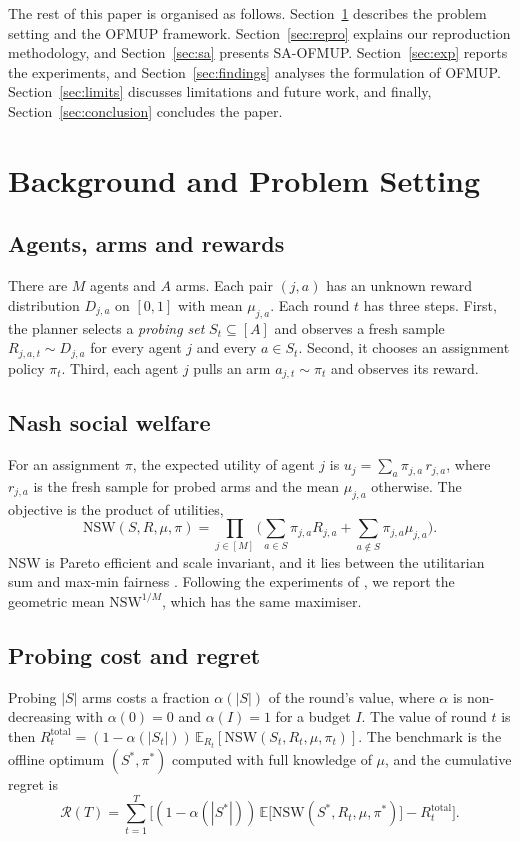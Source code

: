 \documentclass[letterpaper]{article}
\newcommand{\NSW}{\mathrm{NSW}}
\newcommand{\E}{\mathbb{E}}
\begin{document}
The rest of this paper is organised as follows. Section~\ref{sec:background}
describes the problem setting and the OFMUP framework.
Section~\ref{sec:repro} explains our reproduction methodology, and
Section~\ref{sec:sa} presents SA-OFMUP. Section~\ref{sec:exp} reports the
experiments, and Section~\ref{sec:findings} analyses the formulation of OFMUP.
Section~\ref{sec:limits} discusses limitations and future work, and finally,
Section~\ref{sec:conclusion} concludes the paper.

\section{Background and Problem Setting}
\label{sec:background}

\subsection{Agents, arms and rewards}
There are $M$ agents and $A$ arms. Each pair $(j,a)$ has an unknown reward
distribution $D_{j,a}$ on $[0,1]$ with mean $\mu_{j,a}$. Each round $t$ has three
steps. First, the planner selects a \emph{probing set} $S_t\subseteq[A]$ and
observes a fresh sample $R_{j,a,t}\sim D_{j,a}$ for every agent $j$ and every
$a\in S_t$. Second, it chooses an assignment policy $\pi_t$. Third, each agent
$j$ pulls an arm $a_{j,t}\sim\pi_t$ and observes its reward.

\subsection{Nash social welfare}
For an assignment $\pi$, the expected utility of agent $j$ is $u_j=\sum_a
\pi_{j,a}\,r_{j,a}$, where $r_{j,a}$ is the fresh sample for probed arms and the
mean $\mu_{j,a}$ otherwise. The objective is the product of utilities,
\begin{equation}
  \NSW(S,R,\mu,\pi)=\prod_{j\in[M]}\Big(\sum_{a\in S}\pi_{j,a}R_{j,a}+\sum_{a\notin S}\pi_{j,a}\mu_{j,a}\Big).
  \label{eq:nsw}
\end{equation}
NSW is Pareto efficient and scale invariant, and it lies between the
utilitarian sum and max-min fairness \citep{caragiannis2019unreasonable}.
Following the experiments of \citet{xu2026fair}, we report the geometric mean
$\NSW^{1/M}$, which has the same maximiser.

\subsection{Probing cost and regret}
Probing $|S|$ arms costs a fraction $\alpha(|S|)$ of the round's value, where
$\alpha$ is non-decreasing with $\alpha(0)=0$ and $\alpha(I)=1$ for a budget $I$.
The value of round $t$ is then
$R^{\mathrm{total}}_t=(1-\alpha(|S_t|))\,\E_{R_t}[\NSW(S_t,R_t,\mu,\pi_t)]$. The
benchmark is the offline optimum $(S^\ast,\pi^\ast)$ computed with full
knowledge of $\mu$, and the cumulative regret is
\begin{equation}
  \mathcal{R}(T)=\sum_{t=1}^T\Big[(1-\alpha(|S^\ast|))\,\E\big[\NSW(S^\ast,R_t,\mu,\pi^\ast)\big]-R^{\mathrm{total}}_t\Big].
  \label{eq:regret}
\end{equation}
\end{document}
